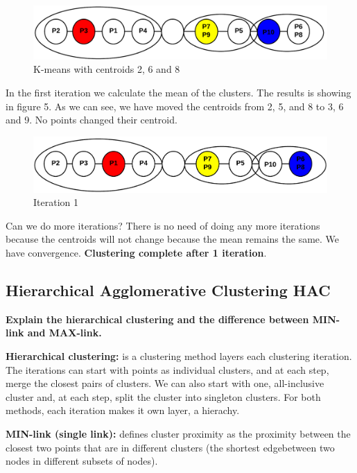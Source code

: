 	\begin{figure}[H]
		\includegraphics[width=\textwidth]{clustering2.png}	
		\caption{K-means with centroids 2, 6 and 8}
	\end{figure}

	In the first iteration we calculate the mean of the clusters. The results is
	showing in figure 5. As we can see, we have moved the centroids from 2, 5, and 8 to 
	3, 6 and 9. No points changed their centroid. 

	\begin{figure}[H]
		\includegraphics[width=\textwidth]{clustering4.png}	
		\caption{Iteration 1}
	\end{figure}

	Can we do more iterations? There is no need of doing any more iterations because
	the centroids will not change because the mean remains the same. 
	We have convergence. {\bf Clustering complete after 1 iteration}.

	\clearpage
	\subsection{Hierarchical Agglomerative Clustering HAC}

		{\bf Explain the hierarchical clustering and the difference between MIN-link
		and MAX-link.}

		\noindent\makebox[\linewidth]{\rule{\textwidth}{1pt}} 

		{\bf Hierarchical clustering:} is a clustering method layers each clustering iteration.
		The iterations can start with points as individual clusters, and at each step, merge
		the closest pairs of clusters. We can also start with one, all-inclusive cluster and, 
		at each step, split the cluster into singleton clusters. For both methods, each
		iteration makes it own layer, a hierachy.

		{\bf MIN-link (single link):} defines cluster proximity as the proximity between the closest two points
		that are in different clusters (the shortest edgebetween two nodes in different subsets
		of nodes).

